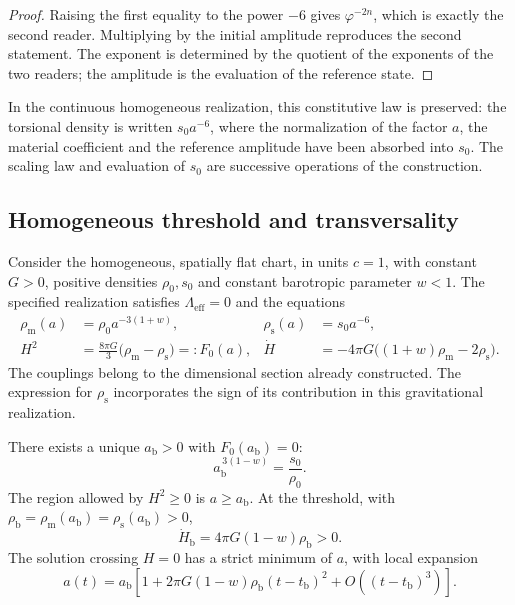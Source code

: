 \begin{proof}
Raising the first equality to the power \(-6\) gives
\(\varphi^{-2n}\), which is exactly the second reader. Multiplying
by the initial amplitude reproduces the second statement. The exponent
is determined by the quotient of the exponents of the two
readers; the amplitude is the evaluation of the reference state.
\end{proof}

In the continuous homogeneous realization, this constitutive law is preserved:
the torsional density is written \(s_0a^{-6}\), where the normalization
of the factor \(a\), the material coefficient and the reference amplitude
have been absorbed into \(s_0\). The scaling law and evaluation of
\(s_0\) are successive operations of the construction.

\subsection{Homogeneous threshold and transversality}
\label{vii:vii:sec:umbral-rebote}

Consider the homogeneous, spatially flat chart, in units \(c=1\),
with constant \(G>0\), positive densities \(\rho_0,s_0\) and constant
barotropic parameter \(w<1\). The specified realization satisfies
\(\Lambda_{\mathrm{eff}}=0\) and the equations
\begin{align}
 \rho_{\mathrm m}(a)&=\rho_0a^{-3(1+w)},&
 \rho_{\mathrm s}(a)&=s_0a^{-6},\\
 H^2&=\frac{8\pi G}{3}
        \bigl(\rho_{\mathrm m}-\rho_{\mathrm s}\bigr)
        =:F_0(a),&
 \dot H&=-4\pi G
        \bigl((1+w)\rho_{\mathrm m}-2\rho_{\mathrm s}\bigr).
 \label{vii:vii:eq:dinamica-homogenea}
\end{align}
The couplings belong to the dimensional section already constructed.
The expression for \(\rho_{\mathrm s}\) incorporates the sign of its
contribution in this gravitational realization.

\begin{theorem}
\label{vii:vii:thm:rebote}
There exists a unique \(a_{\mathrm b}>0\) with \(F_0(a_{\mathrm b})=0\):
\[
 a_{\mathrm b}^{\,3(1-w)}=\frac{s_0}{\rho_0}.
\]
The region allowed by \(H^2\geq0\) is \(a\geq a_{\mathrm b}\).
At the threshold, with
\(\rho_{\mathrm b}=\rho_{\mathrm m}(a_{\mathrm b})
                  =\rho_{\mathrm s}(a_{\mathrm b})>0\),
\[
 \dot H_{\mathrm b}=4\pi G(1-w)\rho_{\mathrm b}>0.
\]
The solution crossing \(H=0\) has a strict minimum of \(a\),
with local expansion
\[
 a(t)=a_{\mathrm b}\left[
 1+2\pi G(1-w)\rho_{\mathrm b}(t-t_{\mathrm b})^2
 +O((t-t_{\mathrm b})^3)\right].
\]
\end{theorem}

